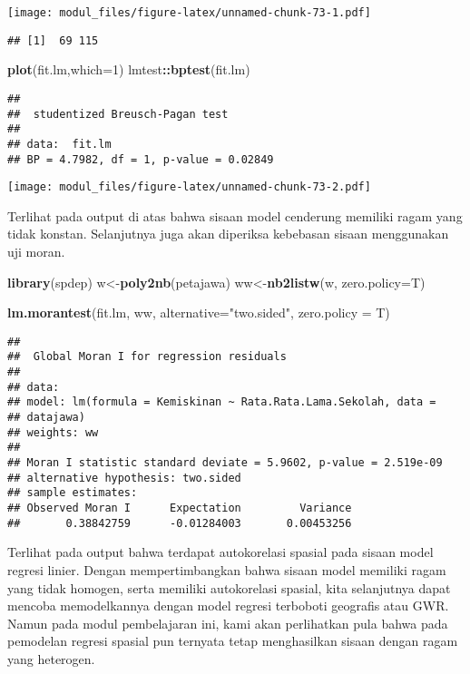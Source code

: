 \documentclass[
]{book}
\newenvironment{Shaded}{\begin{snugshade}}{\end{snugshade}}
\newcommand{\DataTypeTok}[1]{\textcolor[rgb]{0.13,0.29,0.53}{#1}}
\newcommand{\DecValTok}[1]{\textcolor[rgb]{0.00,0.00,0.81}{#1}}
\newcommand{\KeywordTok}[1]{\textcolor[rgb]{0.13,0.29,0.53}{\textbf{#1}}}
\newcommand{\NormalTok}[1]{#1}
\newcommand{\OperatorTok}[1]{\textcolor[rgb]{0.81,0.36,0.00}{\textbf{#1}}}
\newcommand{\StringTok}[1]{\textcolor[rgb]{0.31,0.60,0.02}{#1}}
\begin{document}
\texttt{[image: modul\_files/figure-latex/unnamed-chunk-73-1.pdf]}

\begin{verbatim}
## [1]  69 115
\end{verbatim}

\begin{Shaded}
\begin{Highlighting}[]
\KeywordTok{plot}\NormalTok{(fit.lm,}\DataTypeTok{which=}\DecValTok{1}\NormalTok{)}
\NormalTok{lmtest}\OperatorTok{::}\KeywordTok{bptest}\NormalTok{(fit.lm)}
\end{Highlighting}
\end{Shaded}

\begin{verbatim}
## 
##  studentized Breusch-Pagan test
## 
## data:  fit.lm
## BP = 4.7982, df = 1, p-value = 0.02849
\end{verbatim}

\texttt{[image: modul\_files/figure-latex/unnamed-chunk-73-2.pdf]}

Terlihat pada output di atas bahwa sisaan model cenderung memiliki ragam yang tidak konstan. Selanjutnya juga akan diperiksa kebebasan sisaan menggunakan uji moran.

\begin{Shaded}
\begin{Highlighting}[]
\KeywordTok{library}\NormalTok{(spdep)}
\NormalTok{w\textless{}{-}}\KeywordTok{poly2nb}\NormalTok{(petajawa)}
\NormalTok{ww\textless{}{-}}\KeywordTok{nb2listw}\NormalTok{(w, }\DataTypeTok{zero.policy=}\NormalTok{T)}

\KeywordTok{lm.morantest}\NormalTok{(fit.lm, ww, }\DataTypeTok{alternative=}\StringTok{"two.sided"}\NormalTok{, }\DataTypeTok{zero.policy =}\NormalTok{ T)}
\end{Highlighting}
\end{Shaded}

\begin{verbatim}
## 
##  Global Moran I for regression residuals
## 
## data:  
## model: lm(formula = Kemiskinan ~ Rata.Rata.Lama.Sekolah, data =
## datajawa)
## weights: ww
## 
## Moran I statistic standard deviate = 5.9602, p-value = 2.519e-09
## alternative hypothesis: two.sided
## sample estimates:
## Observed Moran I      Expectation         Variance 
##       0.38842759      -0.01284003       0.00453256
\end{verbatim}

Terlihat pada output bahwa terdapat autokorelasi spasial pada sisaan model regresi linier. Dengan mempertimbangkan bahwa sisaan model memiliki ragam yang tidak homogen, serta memiliki autokorelasi spasial, kita selanjutnya dapat mencoba memodelkannya dengan model regresi terboboti geografis atau GWR. Namun pada modul pembelajaran ini, kami akan perlihatkan pula bahwa pada pemodelan regresi spasial pun ternyata tetap menghasilkan sisaan dengan ragam yang heterogen.
\end{document}
